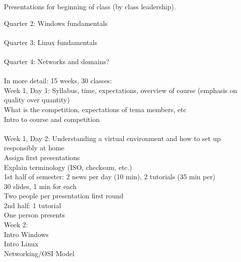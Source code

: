 \documentclass{article}
\begin{document}
\noindent Presentations for beginning of class (by class leadership).

\noindent Quarter 2: Windows fundamentals\\\\
Quarter 3: Linux fundamentals\\\\
Quarter 4: Networks and domains? \\\\

\noindent In more detail: 15 weeks, 30 classes:\\

\noindent Week 1, Day 1: Syllabus, time, expectations, overview of course (emphasis on quality over quantity)\\ 
What is the competition, expectations of tema members, etc\\
Intro to course and competition \\\\
Week 1, Day 2: Understanding a virtual environment and how to set up responsibly at home\\
Assign first presentations\\
Explain terminology (ISO, checksum, etc.)\\

\noindent 1st half of semester: 2 news per day (10 min), 2 tutorials (35 min per)\\
30 slides, 1 min for each\\
Two people per presentation first round\\

\noindent 2nd half: 1 tutorial\\
One person presents\\

\noindent Week 2:\\
\noindent Intro Windows\\
Intro Linux\\
Networking/OSI Model\\
\end{document}

